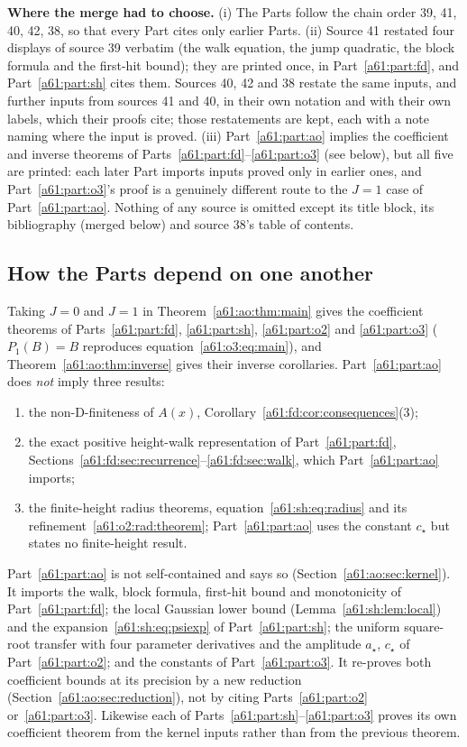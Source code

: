 \documentclass[11pt,letterpaper]{article}
\numberwithin{equation}{section}
\theoremstyle{remark}\newtheorem{remark}[theorem]{Remark}
\begin{document}
\noindent\textbf{Where the merge had to choose.} (i) The Parts follow the chain order 39, 41, 40, 42, 38, so that every Part cites only earlier Parts. (ii) Source 41 restated four displays of source 39 verbatim (the walk equation, the jump quadratic, the block formula and the first-hit bound); they are printed once, in Part~\ref{a61:part:fd}, and Part~\ref{a61:part:sh} cites them. Sources 40, 42 and 38 restate the same inputs, and further inputs from sources 41 and 40, in their own notation and with their own labels, which their proofs cite; those restatements are kept, each with a note naming where the input is proved. (iii) Part~\ref{a61:part:ao} implies the coefficient and inverse theorems of Parts~\ref{a61:part:fd}--\ref{a61:part:o3} (see below), but all five are printed: each later Part imports inputs proved only in earlier ones, and Part~\ref{a61:part:o3}'s proof is a genuinely different route to the $J=1$ case of Part~\ref{a61:part:ao}. Nothing of any source is omitted except its title block, its bibliography (merged below) and source 38's table of contents.

\subsection*{How the Parts depend on one another}
\label{a61:guide:dependencies}
Taking $J=0$ and $J=1$ in Theorem~\ref{a61:ao:thm:main} gives the coefficient theorems of Parts~\ref{a61:part:fd}, \ref{a61:part:sh}, \ref{a61:part:o2} and \ref{a61:part:o3} ($P_1(B)=B$ reproduces equation~\eqref{a61:o3:eq:main}), and Theorem~\ref{a61:ao:thm:inverse} gives their inverse corollaries. Part~\ref{a61:part:ao} does \emph{not} imply three results:
\begin{enumerate}
\item the non-D-finiteness of $A(x)$, Corollary~\ref{a61:fd:cor:consequences}(3);
\item the exact positive height-walk representation of Part~\ref{a61:part:fd}, Sections~\ref{a61:fd:sec:recurrence}--\ref{a61:fd:sec:walk}, which Part~\ref{a61:part:ao} imports;
\item the finite-height radius theorems, equation~\eqref{a61:sh:eq:radius} and its refinement~\eqref{a61:o2:rad:theorem}; Part~\ref{a61:part:ao} uses the constant $c_\star$ but states no finite-height result.
\end{enumerate}
Part~\ref{a61:part:ao} is not self-contained and says so (Section~\ref{a61:ao:sec:kernel}). It imports the walk, block formula, first-hit bound and monotonicity of Part~\ref{a61:part:fd}; the local Gaussian lower bound (Lemma~\ref{a61:sh:lem:local}) and the expansion~\eqref{a61:sh:eq:psiexp} of Part~\ref{a61:part:sh}; the uniform square-root transfer with four parameter derivatives and the amplitude $a_\star$, $c_\star$ of Part~\ref{a61:part:o2}; and the constants of Part~\ref{a61:part:o3}. It re-proves both coefficient bounds at its precision by a new reduction (Section~\ref{a61:ao:sec:reduction}), not by citing Parts~\ref{a61:part:o2} or~\ref{a61:part:o3}. Likewise each of Parts~\ref{a61:part:sh}--\ref{a61:part:o3} proves its own coefficient theorem from the kernel inputs rather than from the previous theorem.
\end{document}
